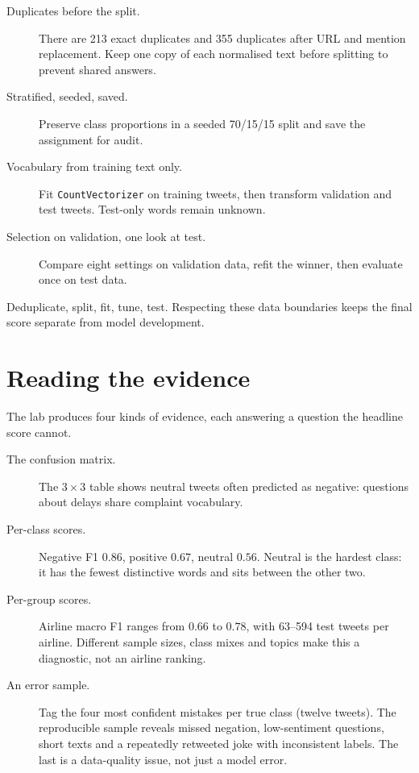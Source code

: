 \begin{description}
  \item[Duplicates before the split.] There are 213 exact duplicates and 355 duplicates after URL and mention replacement. Keep one copy of each normalised text before splitting to prevent shared answers.
  \item[Stratified, seeded, saved.] Preserve class proportions in a seeded 70/15/15 split and save the assignment for audit.
  \item[Vocabulary from training text only.] Fit \texttt{CountVectorizer} on training tweets, then transform validation and test tweets. Test-only words remain unknown.
  \item[Selection on validation, one look at test.] Compare eight settings on validation data, refit the winner, then evaluate once on test data.
\end{description}

\begin{keyidea}
Deduplicate, split, fit, tune, test. Respecting these data boundaries keeps the final score separate from model development.
\end{keyidea}

\section{Reading the evidence}

The lab produces four kinds of evidence, each answering a question the headline score cannot.

\begin{description}
  \item[The confusion matrix.] The $3\times3$ table shows neutral tweets often predicted as negative: questions about delays share complaint vocabulary.
  \item[Per-class scores.] Negative F1 $0.86$, positive $0.67$, neutral $0.56$. Neutral is the hardest class: it has the fewest distinctive words and sits between the other two.
  \item[Per-group scores.] Airline macro F1 ranges from $0.66$ to $0.78$, with 63--594 test tweets per airline. Different sample sizes, class mixes and topics make this a diagnostic, not an airline ranking.
  \item[An error sample.] Tag the four most confident mistakes per true class (twelve tweets). The reproducible sample reveals missed negation, low-sentiment questions, short texts and a repeatedly retweeted joke with inconsistent labels. The last is a data-quality issue, not just a model error.
\end{description}

